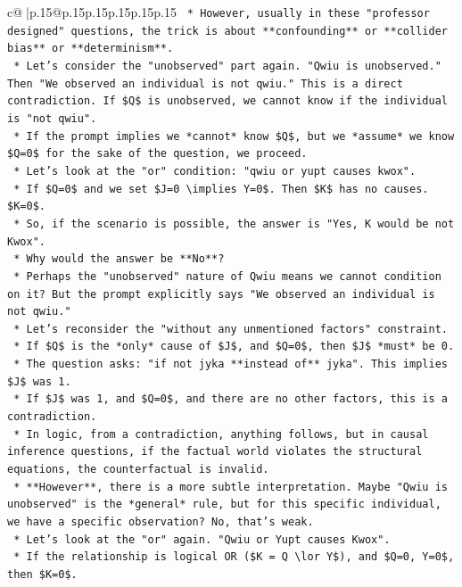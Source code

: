\documentclass{article}
\begin{document}
{\begin{supertabular}{c@{$\;$}|p{.15\linewidth}@{}p{.15\linewidth}p{.15\linewidth}p{.15\linewidth}p{.15\linewidth}p{.15\linewidth}}
{{{\texttt{    *   However, usually in these "professor designed" questions, the trick is about **confounding** or **collider bias** or **determinism**.} \\
\texttt{    *   Let's consider the "unobserved" part again. "Qwiu is unobserved." Then "We observed an individual is not qwiu." This is a direct contradiction. If \$Q\$ is unobserved, we cannot know if the individual is "not qwiu".} \\
\texttt{    *   If the prompt implies we *cannot* know \$Q\$, but we *assume* we know \$Q=0\$ for the sake of the question, we proceed.} \\
\texttt{    *   Let's look at the "or" condition: "qwiu or yupt causes kwox".} \\
\texttt{    *   If \$Q=0\$ and we set \$J=0 \textbackslash{}implies Y=0\$. Then \$K\$ has no causes. \$K=0\$.} \\
\texttt{    *   So, if the scenario is possible, the answer is "Yes, K would be not Kwox".} \\
\texttt{    *   Why would the answer be **No**?} \\
\texttt{    *   Perhaps the "unobserved" nature of Qwiu means we cannot condition on it? But the prompt explicitly says "We observed an individual is not qwiu."} \\
\texttt{    *   Let's reconsider the "without any unmentioned factors" constraint.} \\
\texttt{    *   If \$Q\$ is the *only* cause of \$J\$, and \$Q=0\$, then \$J\$ *must* be 0.} \\
\texttt{    *   The question asks: "if not jyka **instead of** jyka". This implies \$J\$ was 1.} \\
\texttt{    *   If \$J\$ was 1, and \$Q=0\$, and there are no other factors, this is a contradiction.} \\
\texttt{    *   In logic, from a contradiction, anything follows, but in causal inference questions, if the factual world violates the structural equations, the counterfactual is invalid.} \\
\texttt{    *   **However**, there is a more subtle interpretation. Maybe "Qwiu is unobserved" is the *general* rule, but for this specific individual, we have a specific observation? No, that's weak.} \\
\texttt{    *   Let's look at the "or" again. "Qwiu or Yupt causes Kwox".} \\
\texttt{    *   If the relationship is logical OR (\$K = Q \textbackslash{}lor Y\$), and \$Q=0, Y=0\$, then \$K=0\$.} \\
}}}
\end{supertabular}}
\end{document}
